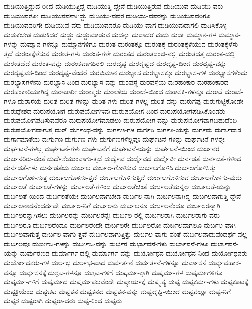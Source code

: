{ದುಡಿಯುತ್ತಿದ್ದುದ-ರಿಂದ
ದುಡಿಯುತ್ತಿದ್ದೆ
ದುಡಿಯುತ್ತಿ-ದ್ದೇನೆ
ದುಡಿಯುತ್ತಿರುವ
ದುಡಿಯುವ
ದುಡಿಯು-ವರು
ದುಡಿಯುವರೋ
ದುಡಿಯುವವನಾಗಿದ್ದು
ದುಡಿಯು-ವವರ
ದುಡಿಯು-ವವರನ್ನು
ದುಡಿಯುವವರಿಗೂ
ದುಡಿಯುವವರಿಗೇ
ದುಡಿಯುವ-ವರು
ದುಡಿಯುವವರೂ
ದುಡಿಯು-ವಾಗ
ದುಡಿಯುವುದಾಗಲಿ
ದುಡಿಸಿಕೊಳ್ಳ
ದುಡುಕಬೇಡ
ದುಡುಕಿದರೆ
ದುಡ್ಡು
ದುಡ್ಡುಮಾಡುವ
ದುದನ್ನು
ದುದಾದರೆ
ದುದು
ದುದೇ
ದುಮ್ಮಾನ-ಗಳ
ದುಮ್ಮಾನ-ಗಳನ್ನು
ದುಮ್ಮಾನ-ಗಳನ್ನೂ
ದುಮ್ಮಾನಗಳಿಗೂ
ದುರಂತ
ದುರಂತಕ್ಕೂ
ದುರಂತಕ್ಕೆ
ದುರಂತಕ್ಕೆಳೆಯುವ
ದುರಂತಕ್ಕೆಳೆಸು-ತ್ತದೆ
ದುರಂತಕ್ಕೆಳೆಸುವ
ದುರಂತ-ಗಳು
ದುರಂತ-ಗಳೇ
ದುರಂತದ
ದುರಂತದಂಚಿ-ನಲ್ಲಿ
ದುರಂತದತ್ತ
ದುರಂತ-ದಲ್ಲಿ
ದುರಂತದೆಡೆ
ದುರಂತ-ವನ್ನು
ದುರಂತವಾಗದಿರಲಿ
ದುರದೃಷ್ಟ
ದುರದೃಷ್ಟದ
ದುರದೃಷ್ಟ-ದಿಂದ
ದುರದೃಷ್ಟ-ವನ್ನು
ದುರದೃಷ್ಟವಶ-ದಿಂದ
ದುರದೃಷ್ಟ-ವೆಂದರೆ
ದುರಭಿಮಾನ
ದುರಭ್ಯಾಸ
ದುರಭ್ಯಾಸಕ್ಕೂ
ದುರಭ್ಯಾಸ-ಗಳ
ದುರಭ್ಯಾಸಗಳೆಂದು
ದುರಭ್ಯಾಸಗಳೇನು
ದುರಭ್ಯಾಸ-ದಿಂದ
ದುರಭ್ಯಾಸ-ವನ್ನು
ದುರವಸ್ಥೆ
ದುರವಸ್ಥೆಯ
ದುರಹಂಕಾರ
ದುರಹಂಕಾರದ
ದುರಹಂಕಾರಿಯಾಗಿದ್ದ
ದುರಾಚಾರೀ
ದುರಾತ್ಮರು
ದುರಾಶೆಯ
ದುರಾಶೆ-ಯಿಂದ
ದುರಾಸಕ್ತಿ-ಗಳನ್ನೂ
ದುರಾಸೆ
ದುರಾಸೆ-ಗಳೂ
ದುರಾಸೆಯ
ದುರಿತ
ದುರಿತ-ಗಳನ್ನು
ದುರಿತ-ಗಳು
ದುರಿತ-ಗಳೆಲ್ಲ
ದುರಿತ-ವನ್ನು
ದುರುಗಪ್ಪ
ದುರುಗುಟ್ಟಿಕೊಂಡೇ
ದುರುದ್ದೇಶದ
ದುರುಪಯೋಗ
ದುರುಪಯೋಗಇವು
ದುರುಪಯೋಗ-ದಿಂದ
ದುರುಪಯೋಗಪಡಿಸಿಕೊಂಡರು
ದುರುಪಯೋಗಪಡಿಸುವವರೂ
ದುರುಪಯೋಗಮಾಡಲು
ದುರುಪಯೋಗ-ವನ್ನು
ದುರುಪಯೋಗವಾಗಬಹುದೆಂಬ
ದುರುಪಯೋಗವಾಗುತ್ತ
ದುರ್
ದುರ್ಗಂಧ-ವನ್ನು
ದುರ್ಗಣ-ಗಳ
ದುರ್ಗತಿ
ದುರ್ಗತಿ-ಯನ್ನು
ದುರ್ಗಮ
ದುರ್ಗಾದಾಸ
ದುರ್ಗಾಮಾತೆಯ
ದುರ್ಗುಣ
ದುರ್ಗುಣ-ಗಳು
ದುರ್ಗುಣಗಳೆಲ್ಲವೂ
ದುರ್ಘಟನೆ-ಗಳನ್ನು
ದುರ್ಘಟನೆ-ಗಳನ್ನೇ
ದುರ್ಘಟನೆ-ಗಳಲ್ಲ
ದುರ್ಘಟನೆ-ಗಳು
ದುರ್ಘಟನೆಗೆ
ದುರ್ಘಟನೆ-ಯನ್ನು
ದುರ್ಘಟನೆ-ಯಿಂದ
ದುರ್ಜನರ
ದುರ್ಜನರಿರು-ವಂತೆ
ದುರ್ದೆಶೆಯುಂಟಾಗು-ತ್ತದೆ
ದುರ್ದೈವ
ದುರ್ದೈವದ
ದುರ್ದೈವೀ
ದುರ್ನಡತೆ
ದುರ್ನಡತೆ-ಗಳಿಂದ
ದುರ್ನಡತೆ-ಗಳು
ದುರ್ನಡತೆಯ
ದುರ್ಬಲ
ದುರ್ಬಲ-ಗೊಳಿಸುವ
ದುರ್ಬಲಗೊಳಿಸಿ
ದುರ್ಬಲಗೊಳಿಸಿತ್ತು
ದುರ್ಬಲಗೊಳಿ-ಸುತ್ತ
ದುರ್ಬಲಗೊಳಿಸು-ತ್ತದೆ
ದುರ್ಬಲಗೊಳಿಸುತ್ತಿದೆ
ದುರ್ಬಲಗೊಳಿಸುವ
ದುರ್ಬಲಗೊಳಿಸು-ವುದು
ದುರ್ಬಲತೆ
ದುರ್ಬಲತೆ-ಗಳನ್ನು
ದುರ್ಬಲತೆ-ಗಳಿಂದ
ದುರ್ಬಲತೆಚಿಂತೆ
ದುರ್ಬಲತೆಯನ್ನಲ್ಲ
ದುರ್ಬಲತೆ-ಯನ್ನು
ದುರ್ಬಲತೆ-ಯಿಂದ
ದುರ್ಬಲತೆಯೇ
ದುರ್ಬಲನಾಗಬೇಡ
ದುರ್ಬಲ-ನಾಗಿ
ದುರ್ಬಲನಾಗಿದ್ದ
ದುರ್ಬಲನಾಗುತ್ತಿ-ದ್ದೇನೆ
ದುರ್ಬಲನಾದನೆಂದರ್ಥವೇ
ದುರ್ಬಲ-ನಿಗೆ
ದುರ್ಬಲನು
ದುರ್ಬಲನೂ
ದುರ್ಬಲನೆಂದೂ
ದುರ್ಬಲರನ್ನಾಗಿ
ದುರ್ಬಲರನ್ನಾಗಿಸಲು
ದುರ್ಬಲರನ್ನು
ದುರ್ಬಲರನ್ನೇ
ದುರ್ಬಲ-ರಲ್ಲಿ
ದುರ್ಬಲರಾಗಿ
ದುರ್ಬಲರಾಗು-ವರು
ದುರ್ಬಲರೂ
ದುರ್ಬಲರೆಂದೂ
ದುರ್ಬಲರೆಂದೇ
ದುರ್ಬಲರೇ
ದುರ್ಬಲರೋ
ದುರ್ಬಲವಾಗಲೂ
ದುರ್ಬಲ-ವಾಗಿ
ದುರ್ಬಲವಾಗುತ್ತ
ದುರ್ಬಲ-ವಾಗು-ತ್ತವೆ
ದುರ್ಬಲವಾಗುತ್ತಿತ್ತು
ದುರ್ಬಲ-ವಾಗು-ವಂತೆ
ದುರ್ಬಲವಾದುವೆಂದರ್ಥ-ವಲ್ಲ
ದುರ್ಬಲವೂ
ದುರ್ಬೀಜ-ಗಳನ್ನು
ದುರ್ಬೀಜ-ವನ್ನು
ದುರ್ಭರ
ದುರ್ಭಾವನೆ-ಗಳು
ದುರ್ಭಾವನೆ-ಗಳೂ
ದುರ್ಭಾವನೆ-ಯನ್ನು
ದುರ್ಮರಣದ
ದುರ್ಮಾರ್ಗ-ದಲ್ಲಿ
ದುರ್ಮಾರ್ಗ-ವನ್ನು
ದುರ್ಯೋಧನ
ದುರ್ಯೋಧನ-ನಿಂದ
ದುರ್ಯೋಧನರು
ದುರ್ಯೋಧನರು-ಗಳ
ದುರ್ಲಭ
ದುರ್ಲಭ-ವಾದ
ದುರ್ವರ್ತನೆ
ದುರ್ವರ್ತನೆ-ಗಳನ್ನೂ
ದುರ್ವಾಸನೆ
ದುರ್ವ್ಯವಹಾರ-ವನ್ನೂ
ದುರ್ವ್ಯಸನಕ್ಕೆ
ದುಶ್ಚಟ-ಗಳನ್ನೂ
ದುಶ್ಚಟ-ಗಳಿಗೆ
ದುಷ್ಕರ್ಮ-ಕ್ಕಾಗಿ
ದುಷ್ಕರ್ಮ-ಗಳ
ದುಷ್ಕರ್ಮಗಳಿಗೂ
ದುಷ್ಕರ್ಮ-ಗಳಿಗೆ
ದುಷ್ಕರ್ಮದ
ದುಷ್ಕರ್ಮಫಲವೆಂದೇ
ದುಷ್ಕಾರ್ಯಕ್ಕೆ
ದುಷ್ಕೃತ್ಯ
ದುಷ್ಟ
ದುಷ್ಟಕರ್ಮ-ಗಳು
ದುಷ್ಟಕೂಟಕ್ಕೆ
ದುಷ್ಟಕ್ರಿಯೆಯ
ದುಷ್ಟಚಟ
ದುಷ್ಟತನ
ದುಷ್ಟತನದ
ದುಷ್ಟತನ-ವನ್ನು
ದುಷ್ಟದೃಷ್ಟಿ-ಯಿಂದ
ದುಷ್ಟನಲ್ಲೂ
ದುಷ್ಟ-ನಿಗೆ
ದುಷ್ಟರ
ದುಷ್ಟರಾಗಿ
ದುಷ್ಟರಾ-ದರು
ದುಷ್ಟ-ರಿಂದ
ದುಷ್ಟರು
}
